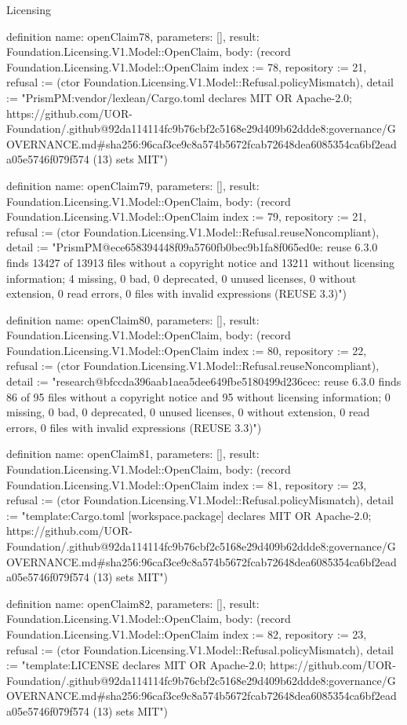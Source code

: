 \begin{lexlean}{Licensing}
\begin{semanticmodule}
definition{
  name: openClaim78,
  parameters: [],
  result: Foundation.Licensing.V1.Model::OpenClaim,
  body: (record Foundation.Licensing.V1.Model::OpenClaim {index := 78, repository := 21, refusal := (ctor Foundation.Licensing.V1.Model::Refusal.policyMismatch), detail := "PrismPM:vendor/lexlean/Cargo.toml declares MIT OR Apache-2.0; https://github.com/UOR-Foundation/.github@92da114114fc9b76cbf2c5168e29d409b62ddde8:governance/GOVERNANCE.md#sha256:96caf3ce9c8a574b5672fcab72648dea6085354ca6bf2eada05e5746f079f574 (13) sets MIT"})
}

definition{
  name: openClaim79,
  parameters: [],
  result: Foundation.Licensing.V1.Model::OpenClaim,
  body: (record Foundation.Licensing.V1.Model::OpenClaim {index := 79, repository := 21, refusal := (ctor Foundation.Licensing.V1.Model::Refusal.reuseNoncompliant), detail := "PrismPM@ece658394448f09a5760fb0bec9b1fa8f065ed0e: reuse 6.3.0 finds 13427 of 13913 files without a copyright notice and 13211 without licensing information; 4 missing, 0 bad, 0 deprecated, 0 unused licenses, 0 without extension, 0 read errors, 0 files with invalid expressions (REUSE 3.3)"})
}

definition{
  name: openClaim80,
  parameters: [],
  result: Foundation.Licensing.V1.Model::OpenClaim,
  body: (record Foundation.Licensing.V1.Model::OpenClaim {index := 80, repository := 22, refusal := (ctor Foundation.Licensing.V1.Model::Refusal.reuseNoncompliant), detail := "research@bfccda396aab1aea5dee649fbe5180499d236cec: reuse 6.3.0 finds 86 of 95 files without a copyright notice and 95 without licensing information; 0 missing, 0 bad, 0 deprecated, 0 unused licenses, 0 without extension, 0 read errors, 0 files with invalid expressions (REUSE 3.3)"})
}

definition{
  name: openClaim81,
  parameters: [],
  result: Foundation.Licensing.V1.Model::OpenClaim,
  body: (record Foundation.Licensing.V1.Model::OpenClaim {index := 81, repository := 23, refusal := (ctor Foundation.Licensing.V1.Model::Refusal.policyMismatch), detail := "template:Cargo.toml [workspace.package] declares MIT OR Apache-2.0; https://github.com/UOR-Foundation/.github@92da114114fc9b76cbf2c5168e29d409b62ddde8:governance/GOVERNANCE.md#sha256:96caf3ce9c8a574b5672fcab72648dea6085354ca6bf2eada05e5746f079f574 (13) sets MIT"})
}

definition{
  name: openClaim82,
  parameters: [],
  result: Foundation.Licensing.V1.Model::OpenClaim,
  body: (record Foundation.Licensing.V1.Model::OpenClaim {index := 82, repository := 23, refusal := (ctor Foundation.Licensing.V1.Model::Refusal.policyMismatch), detail := "template:LICENSE declares MIT OR Apache-2.0; https://github.com/UOR-Foundation/.github@92da114114fc9b76cbf2c5168e29d409b62ddde8:governance/GOVERNANCE.md#sha256:96caf3ce9c8a574b5672fcab72648dea6085354ca6bf2eada05e5746f079f574 (13) sets MIT"})
}


\end{semanticmodule}
\end{lexlean}
